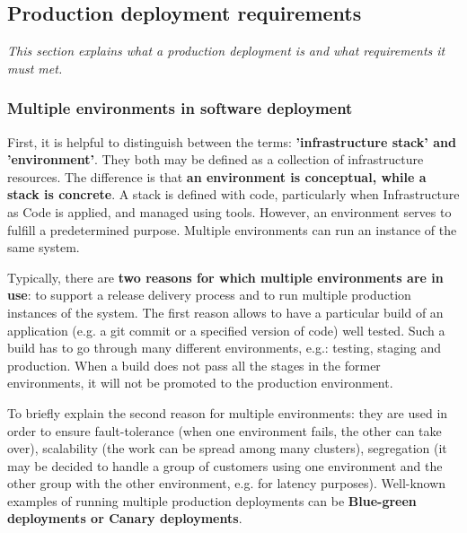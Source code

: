 \subsection{Production deployment requirements}
\textit{This section explains what a production deployment is and what requirements it must met.}
~\\

\subsubsection{Multiple environments in software deployment}
First, it is helpful to distinguish between the terms: \textbf{'infrastructure stack' and 'environment'}. They both may be defined as a collection of infrastructure resources. The difference is that \textbf{an environment is conceptual, while a stack is concrete}. A stack is defined with code, particularly when Infrastructure as Code is applied, and managed using tools. However, an environment serves to fulfill a predetermined purpose. Multiple environments can run an instance of the same system\cite{book-iac}.

Typically, there are \textbf{two reasons for which multiple environments are in use}: to support a release delivery process and to run multiple production instances of the system. The first reason allows to have a particular build of an application (e.g. a git commit or a specified version of code) well tested. Such a build has to go through many different environments, e.g.: testing, staging and production. When a build does not pass all the stages in the former environments, it will not be promoted to the production environment\cite{book-iac}\cite{book-cicd}.

To briefly explain the second reason for multiple environments: they are used in order to ensure fault-tolerance (when one environment fails, the other can take over), scalability (the work can be spread among many clusters), segregation (it may be decided to handle a group of customers using one environment and the other group with the other environment, e.g. for latency purposes)\cite{book-iac}. Well-known examples of running multiple production deployments can be \textbf{Blue-green deployments or Canary deployments}\cite{bachelor-ha}.

